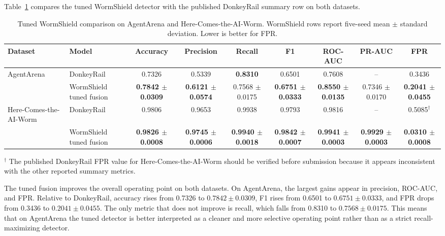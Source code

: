 Table~\ref{tab:tuned-main-results} compares the tuned WormShield
detector with the published DonkeyRail summary row on both
datasets.

\begin{table}[t]
\centering
\small
\setlength{\tabcolsep}{4pt}
\caption{Tuned WormShield comparison on AgentArena and
Here-Comes-the-AI-Worm. WormShield rows report five-seed mean
$\pm$ standard deviation. Lower is better for FPR.}
\label{tab:tuned-main-results}
\begin{tabular}{llccccccc}
\toprule
Dataset & Model & Accuracy & Precision & Recall & F1 & ROC-AUC & PR-AUC & FPR \\
\midrule
AgentArena
& DonkeyRail
& 0.7326
& 0.5339
& \textbf{0.8310}
& 0.6501
& 0.7608
& --
& 0.3436 \\
& WormShield tuned fusion
& \textbf{0.7842 $\pm$ 0.0309}
& \textbf{0.6121 $\pm$ 0.0574}
& 0.7568 $\pm$ 0.0175
& \textbf{0.6751 $\pm$ 0.0333}
& \textbf{0.8550 $\pm$ 0.0135}
& 0.7346 $\pm$ 0.0170
& \textbf{0.2041 $\pm$ 0.0455} \\
\midrule
Here-Comes-the-AI-Worm
& DonkeyRail
& 0.9806
& 0.9653
& 0.9938
& 0.9793
& 0.9816
& --
& 0.5085$^{\dagger}$ \\
& WormShield tuned fusion
& \textbf{0.9826 $\pm$ 0.0008}
& \textbf{0.9745 $\pm$ 0.0006}
& \textbf{0.9940 $\pm$ 0.0018}
& \textbf{0.9842 $\pm$ 0.0007}
& \textbf{0.9941 $\pm$ 0.0003}
& \textbf{0.9929 $\pm$ 0.0003}
& \textbf{0.0310 $\pm$ 0.0008} \\
\bottomrule
\end{tabular}

\vspace{1mm}
\parbox{0.97\textwidth}{\footnotesize
$^{\dagger}$ The published DonkeyRail FPR value for
Here-Comes-the-AI-Worm should be verified before submission because
it appears inconsistent with the other reported summary metrics.}
\end{table}

The tuned fusion improves the overall operating point on both
datasets. On AgentArena, the largest gains appear in precision,
ROC-AUC, and FPR. Relative to DonkeyRail, accuracy rises from
0.7326 to $0.7842 \pm 0.0309$, F1 rises from 0.6501 to
$0.6751 \pm 0.0333$, and FPR drops from 0.3436 to
$0.2041 \pm 0.0455$. The only metric that does not improve is
recall, which falls from 0.8310 to $0.7568 \pm 0.0175$. This means
that on AgentArena the tuned detector is better interpreted as a
cleaner and more selective operating point rather than as a strict
recall-maximizing detector.

